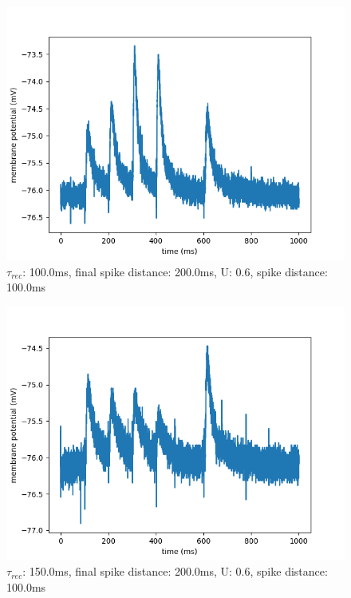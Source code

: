 \documentclass[10pt,a4paper]{scrartcl}
\begin{document}
\begin{figure} [ht]
\begin{center}
\label{fig:abb20}
\caption{$\tau_{rec}$: 100.0ms, final spike distance: 200.0ms, U: 0.6, spike distance: 100.0ms}
\includegraphics[scale=0.35]{pictures/final_spike_variation_9.pdf} 
\end{center}
\end{figure}

\begin{figure} [ht]
\begin{center}
\label{fig:abb21}
\caption{$\tau_{rec}$: 150.0ms, final spike distance: 200.0ms, U: 0.6, spike distance: 100.0ms}
\includegraphics[scale=0.35]{pictures/final_spike_variation_10.pdf} 
\end{center}
\end{figure}
\end{document}
